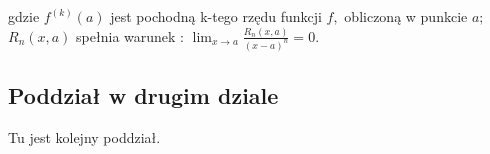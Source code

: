 \documentclass{report}
\begin{document}
gdzie $f^{(k)}(a)$ jest pochodną k-tego rzędu funkcji $f,$ obliczoną w punkcie $a;$ $R_n(x,a)$ spełnia warunek
: $\lim_{x\to a}\frac{R_n(x,a)}{(x-a)^n}=0$.
 
\subsection{Poddział w drugim dziale}
 
Tu jest kolejny poddział.\\
    \hskip 5pt
 
\end{document}
